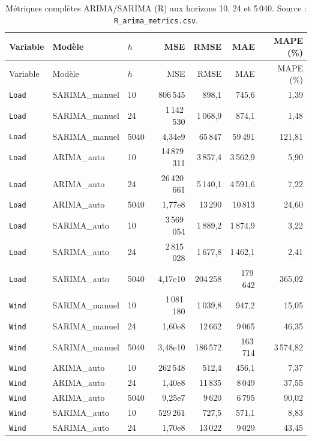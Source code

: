 {\small
\begin{longtable}{lllrrrr}
\caption{Métriques complètes ARIMA/SARIMA (R) aux horizons 10, 24 et 5\,040.
Source : \texttt{R\_arima\_metrics.csv}.}
\label{tab:arima_metrics}\\
\toprule
Variable & Modèle & $h$ & MSE & RMSE & MAE & MAPE (\%) \\
\midrule
\endfirsthead
\toprule
Variable & Modèle & $h$ & MSE & RMSE & MAE & MAPE (\%) \\
\midrule
\endhead
\bottomrule
\endlastfoot
\texttt{Load} & SARIMA\_manuel & 10 & 806\,545 & 898{,}1 & 745{,}6 & 1{,}39 \\
\texttt{Load} & SARIMA\_manuel & 24 & 1\,142\,530 & 1\,068{,}9 & 874{,}1 & 1{,}48 \\
\texttt{Load} & SARIMA\_manuel & 5040 & 4{,}34e9 & 65\,847 & 59\,491 & 121{,}81 \\
\texttt{Load} & ARIMA\_auto & 10 & 14\,879\,311 & 3\,857{,}4 & 3\,562{,}9 & 5{,}90 \\
\texttt{Load} & ARIMA\_auto & 24 & 26\,420\,661 & 5\,140{,}1 & 4\,591{,}6 & 7{,}22 \\
\texttt{Load} & ARIMA\_auto & 5040 & 1{,}77e8 & 13\,290 & 10\,813 & 24{,}60 \\
\texttt{Load} & SARIMA\_auto & 10 & 3\,569\,054 & 1\,889{,}2 & 1\,874{,}9 & 3{,}22 \\
\texttt{Load} & SARIMA\_auto & 24 & 2\,815\,028 & 1\,677{,}8 & 1\,462{,}1 & 2{,}41 \\
\texttt{Load} & SARIMA\_auto & 5040 & 4{,}17e10 & 204\,258 & 179\,642 & 365{,}02 \\
\texttt{Wind} & SARIMA\_manuel & 10 & 1\,081\,180 & 1\,039{,}8 & 947{,}2 & 15{,}05 \\
\texttt{Wind} & SARIMA\_manuel & 24 & 1{,}60e8 & 12\,662 & 9\,065 & 46{,}35 \\
\texttt{Wind} & SARIMA\_manuel & 5040 & 3{,}48e10 & 186\,572 & 163\,714 & 3\,574{,}82 \\
\texttt{Wind} & ARIMA\_auto & 10 & 262\,548 & 512{,}4 & 456{,}1 & 7{,}37 \\
\texttt{Wind} & ARIMA\_auto & 24 & 1{,}40e8 & 11\,835 & 8\,049 & 37{,}55 \\
\texttt{Wind} & ARIMA\_auto & 5040 & 9{,}25e7 & 9\,620 & 6\,795 & 90{,}02 \\
\texttt{Wind} & SARIMA\_auto & 10 & 529\,261 & 727{,}5 & 571{,}1 & 8{,}83 \\
\texttt{Wind} & SARIMA\_auto & 24 & 1{,}70e8 & 13\,022 & 9\,029 & 43{,}45 \\

\end{longtable}}
